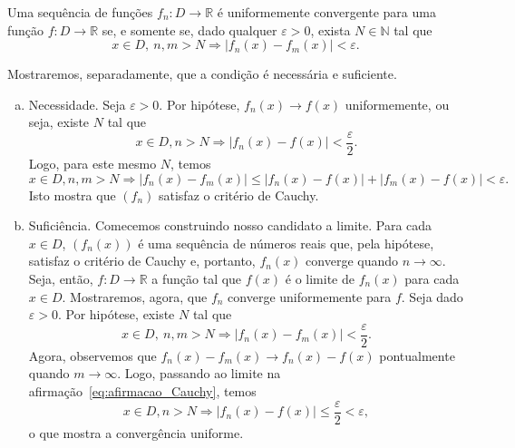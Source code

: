 \begin{teo}\label{teo:sf_criterio_de_Cauchy}
  Uma sequência de funções $f_n:D\to\mathbb{R}$ é uniformemente convergente para uma função $f:D\to\mathbb{R}$ se, e somente se, dado qualquer $\varepsilon>0$, exista $N\in\mathbb{N}$ tal que
  \begin{equation}
    x\in D, ~n,m>N \Rightarrow |f_n(x) - f_m(x)| < \varepsilon.
  \end{equation}
\end{teo}
\begin{dem}
  Mostraremos, separadamente, que a condição é necessária e suficiente.
  \begin{enumerate}[a)]
  \item Necessidade. Seja $\varepsilon>0$. Por hipótese, $f_n(x) \to f(x)$ uniformemente, ou seja, existe $N$ tal que
    \begin{equation}
      x\in D, n>N \Rightarrow |f_n(x) - f(x)| < \frac{\varepsilon}{2}.
    \end{equation}
Logo, para este mesmo $N$, temos
\begin{equation}
  x\in D, n,m > N \Rightarrow |f_n(x)-f_m(x)| \leq |f_n(x)-f(x)|+|f_m(x)-f(x)| < \varepsilon.
\end{equation}
Isto mostra que $(f_n)$ satisfaz o critério de Cauchy.
  \item Suficiência. Comecemos construindo nosso candidato a limite. Para cada $x\in D$, $(f_n(x))$ é uma sequência de números reais que, pela hipótese, satisfaz o critério de Cauchy e, portanto, $f_n(x)$ converge quando $n\to \infty$. Seja, então, $f:D\to \mathbb{R}$ a função tal que $f(x)$ é o limite de $f_n(x)$ para cada $x\in D$.
    Mostraremos, agora, que $f_n$ converge uniformemente para $f$. Seja dado $\varepsilon>0$. Por hipótese, existe $N$ tal que
    \begin{equation}\label{eq:afirmacao_Cauchy}
      x\in D, ~n,m>N \Rightarrow |f_n(x) - f_m(x)| < \frac{\varepsilon}{2}.
    \end{equation}
Agora, observemos que $f_n(x) - f_m(x) \to f_n(x) - f(x)$ pontualmente quando $m\to \infty$. Logo, passando ao limite na afirmação~\eqref{eq:afirmacao_Cauchy}, temos
\begin{equation}
  x\in D, n>N \Rightarrow |f_n(x) - f(x)| \leq \frac{\varepsilon}{2} < \varepsilon,
\end{equation}
o que mostra a convergência uniforme.
  \end{enumerate}
\end{dem}

